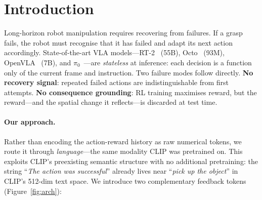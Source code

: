 \documentclass{article}
\newcommand{\modelname}{\textsc{VERA}\xspace}
\begin{document}
\begin{abstract}
for out-of-distribution visual domains, CLIP vision can optionally be
fine-tuned ($+86.2$M, Mode B) while keeping the text encoder frozen.
On Language-Table~\citep{lynch2023languagetable}
(3,000 real episodes from the official Google Research GCS dataset),
\modelname\ achieves $69.0\%\,(\pm0.8\%)$ validation accuracy versus
$68.3\%\,(\pm0.7\%)$ for a strong behavioural-cloning baseline---a
consistent $+0.65$\,pp gain across all three seeds---and six ablation
variants confirm that the full five-stream architecture outperforms
every partial configuration.
Full-convergence results across all 18 condition$\times$seed runs are
ongoing; the numbers reported here represent completed seeds from the
real-data training run.
The full nine-variant ablation study spanning both Language-Table and
CALVIN D$\to$D~\citep{mees2022calvin} is ongoing.
\end{abstract}


\section{Introduction}
\label{sec:intro}

Long-horizon robot manipulation requires recovering from failures.
If a grasp fails, the robot must recognise that it has failed and adapt
its next action accordingly.
State-of-the-art VLA models---RT-2~\citep{brohan2023rt2} (55B),
Octo~\citep{octo2024} (93M), OpenVLA~\citep{kim2024openvla} (7B),
and $\pi_0$~\citep{black2024pi0}---are \emph{stateless} at inference:
each decision is a function only of the current frame and instruction.
Two failure modes follow directly.
\textbf{No recovery signal}: repeated failed actions are
indistinguishable from first attempts.
\textbf{No consequence grounding}: RL training maximises reward, but the
reward---and the spatial change it reflects---is discarded at test time.

\paragraph{Our approach.}
Rather than encoding the action-reward history as raw numerical tokens, we
route it through \emph{language}---the same modality CLIP was pretrained
on.
This exploits CLIP's preexisting semantic structure with no additional
pretraining: the string ``\emph{The action was successful}'' already
lives near ``\emph{pick up the object}'' in CLIP's 512-dim text space.
We introduce two complementary feedback tokens (Figure~\ref{fig:arch}):
\end{document}
